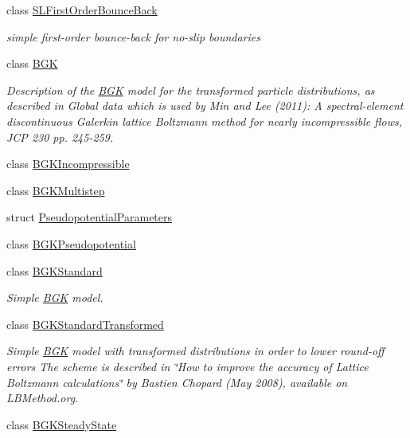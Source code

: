 \begin{DoxyCompactItemize}
class \hyperlink{classnatrium_1_1SLFirstOrderBounceBack}{SLFirstOrderBounceBack}
\begin{DoxyCompactList}\small\item\em simple first-\/order bounce-\/back for no-\/slip boundaries \item\end{DoxyCompactList}\item 
class \hyperlink{classnatrium_1_1BGK}{BGK}
\begin{DoxyCompactList}\small\item\em Description of the \hyperlink{classnatrium_1_1BGK}{BGK} model for the transformed particle distributions, as described in Global data which is used by Min and Lee (2011): A spectral-\/element discontinuous Galerkin lattice Boltzmann method for nearly incompressible flows, JCP 230 pp. 245-\/259. \item\end{DoxyCompactList}\item 
class \hyperlink{classnatrium_1_1BGKIncompressible}{BGKIncompressible}
\item 
class \hyperlink{classnatrium_1_1BGKMultistep}{BGKMultistep}
\item 
struct \hyperlink{structnatrium_1_1PseudopotentialParameters}{PseudopotentialParameters}
\item 
class \hyperlink{classnatrium_1_1BGKPseudopotential}{BGKPseudopotential}
\item 
class \hyperlink{classnatrium_1_1BGKStandard}{BGKStandard}
\begin{DoxyCompactList}\small\item\em Simple \hyperlink{classnatrium_1_1BGK}{BGK} model. \item\end{DoxyCompactList}\item 
class \hyperlink{classnatrium_1_1BGKStandardTransformed}{BGKStandardTransformed}
\begin{DoxyCompactList}\small\item\em Simple \hyperlink{classnatrium_1_1BGK}{BGK} model with transformed distributions in order to lower round-\/off errors The scheme is described in \char`\"{}How to improve the accuracy of Lattice Boltzmann calculations\char`\"{} by Bastien Chopard (May 2008), available on LBMethod.org. \item\end{DoxyCompactList}\item 
class \hyperlink{classnatrium_1_1BGKSteadyState}{BGKSteadyState}

\end{DoxyCompactItemize}
